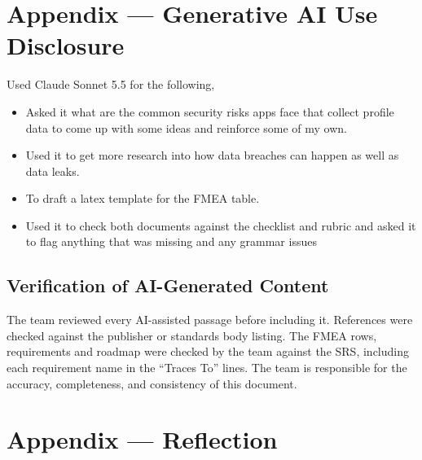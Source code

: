 \documentclass{article}
\begin{document}
\newpage{}

\section{Appendix --- Generative AI Use Disclosure}


Used Claude Sonnet 5.5 for the following,
  \noindent \begin{itemize}
    \item Asked it what are the common security risks apps face that collect profile data to come up with some ideas and reinforce some of my own.
    \item Used it to get more research into how data breaches can happen as well as data leaks.
    \item To draft a latex template for the FMEA table.
    \item Used it to check both documents against the checklist and rubric and
          asked it to flag anything that was missing and any grammar issues
  \end{itemize}


\subsection*{Verification of AI-Generated Content}
The team reviewed every AI-assisted passage before including it. References were checked against the
publisher or standards body listing. The FMEA rows, requirements and roadmap were checked by the team against
the SRS, including each requirement name in the ``Traces To'' lines. The team is responsible for the accuracy,
completeness, and consistency of this document.


\newpage{}

\section{Appendix --- Reflection}



\end{document}
